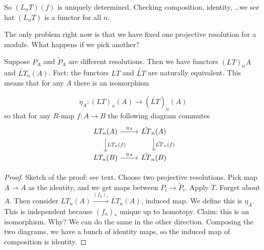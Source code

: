 So $(L_n T) (f)$ is uniquely determined.
Checking composition, identity, \ldots we see hat $(L_n T)$ is a functor for all  $n$.

The only problem right now is that we have fixed one projective resolution for a module.
What happens if we pick another?

Suppose $P_A$ and  $\tilde{P}_A$ are  different resolutions. Then we have functors
$ (LT)_n A$  and $\tilde{LT}_n (A)$.
Fact: the functors $LT$ and  $\tilde{LT}$ are naturally equivalent.
This means that for any $A$ there is an isomorphism

 \[
     \eta_A: (LT)_n (A) \to  (\tilde{LT})_n(A)
\] 
so that for any $R$-map $f: A \to  B$ the following diagram commutes
\[
    \begin{tikzcd}
        LT_n(A) \arrow[d, "LT_n(f)"] \arrow[r, "\eta_A"] & \tilde{LT}_n(A) \arrow[d, "\tilde{LT}_n(f)"]\\
        LT_n(B) \arrow[r, "\eta_A"] & \tilde{LT}_n(B)
    \end{tikzcd}
\]

\begin{proof}
    Sketch of the proof: see text.
    Choose two projective resolutions.
    Pick map $A \to  A$ as the identity, and we get maps between $P_i \to  \tilde{P}_i$.
    Apply $T$.
    Forget about $A$.
    Then consider $LT_n(A) \xrightarrow{(f_n)_*} \tilde{LT}_n(A)$, induced map.
    We define this is $\eta_A$.
    This is independent because  $(f_n)_*$ unique up to homotopy.
    Claim: this is an isomorphism.
    Why? We can do the same in the other direction.
    Composing the two diagrams, we have a bunch of identity maps, so the induced map of composition is identity.
\end{proof}
